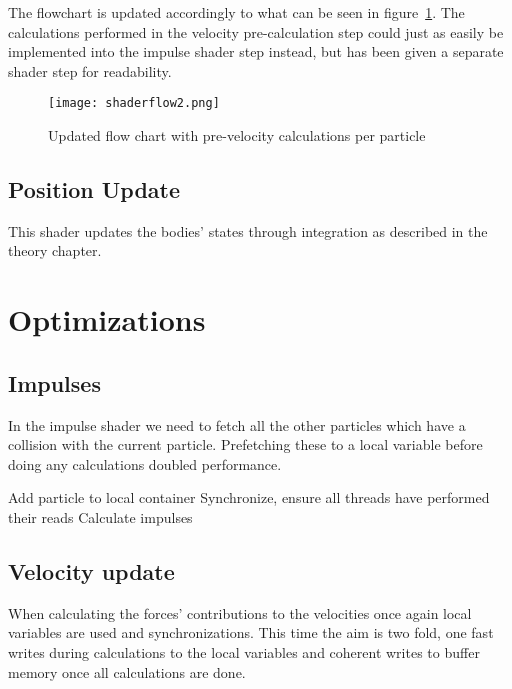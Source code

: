 The flowchart is updated accordingly to what can be seen in figure~\ref{fig:shaderflow2}.
The calculations performed in the velocity pre-calculation step could just as easily
be implemented into the impulse shader step instead, but has been given a separate shader
step for readability.

\begin{figure}[H]
  \centering
  \texttt{[image: shaderflow2.png]}
  \caption{Updated flow chart with pre-velocity calculations per particle}
  \label{fig:shaderflow2}
\end{figure}

\subsection{Position Update}
This shader updates the bodies' states through integration as described in the theory chapter.

\section{Optimizations}
\subsection{Impulses}
In the impulse shader we need to fetch all the other particles which have a collision
with the current particle. Prefetching these to a local variable before doing any
calculations doubled performance.

\begin{algorithm}[H]
  \begin{algorithmic}[1]
    Add particle to local container
  \EndFor
  \State Synchronize, ensure all threads have performed their reads
  \State Calculate impulses
\end{algorithmic}
\end{algorithm}

\subsection{Velocity update}
When calculating the forces' contributions to the velocities once again local variables
are used and synchronizations. This time the aim is two fold, one fast writes during
calculations to the local variables and coherent writes to buffer memory once all
calculations are done.
